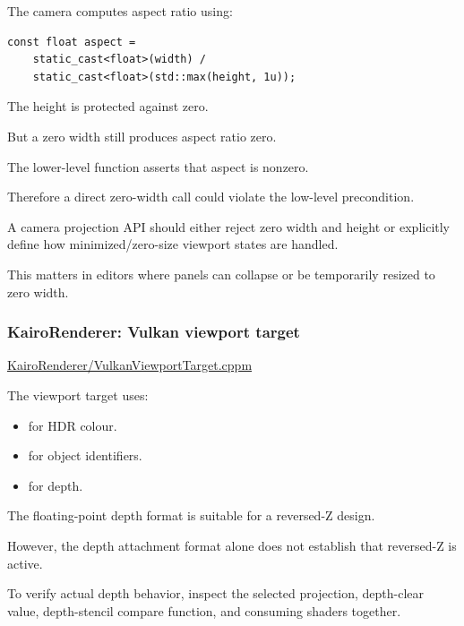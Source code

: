 The camera computes aspect ratio using:

\begin{verbatim}
const float aspect =
    static_cast<float>(width) /
    static_cast<float>(std::max(height, 1u));
\end{verbatim}

The height is protected against zero.

But a zero width still produces aspect ratio zero.

The lower-level  function asserts that aspect is nonzero.

Therefore a direct zero-width call could violate the low-level precondition.

A camera projection API should either reject zero width and height or explicitly define how minimized/zero-size viewport states are handled.

This matters in editors where panels can collapse or be temporarily resized to zero width.

\subsubsection{KairoRenderer: Vulkan viewport target}\label{02-foundations-ii-ch037-kairorenderer-vulkan-viewport-target}

\hypertarget{02-foundations-ii-ch037-kairorenderer-vulkan-viewport-target}{}

\href{https://github.com/swayam8624/KairoRenderer/blob/main/VulkanViewportTarget.cppm?utm_source=chatgpt.com}{KairoRenderer/VulkanViewportTarget.cppm}

The viewport target uses:

\begin{itemize}
\tightlist
\item
   for HDR colour.
\item
   for object identifiers.
\item
   for depth.
\end{itemize}

The floating-point depth format is suitable for a reversed-Z design.

However, the depth attachment format alone does not establish that reversed-Z is active.

To verify actual depth behavior, inspect the selected projection, depth-clear value, depth-stencil compare function, and consuming shaders together.

